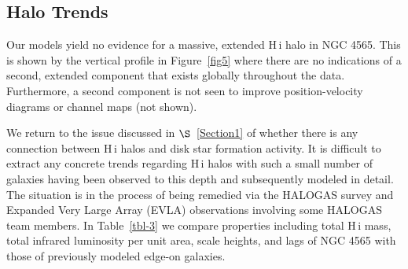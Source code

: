 \documentclass{emulateapj}
\begin{document}
\subsection{Halo Trends} \label{Section6.3}

\par
     Our models yield no evidence for a massive, extended {\sc H\,i} halo in NGC 4565.  This is shown by the vertical profile in Figure~\ref{fig5} where there are no indications of a second, extended component that exists globally throughout the data.  Furthermore, a second component is not seen to improve position-velocity diagrams or channel maps (not shown).  

\par
     We return to the issue discussed in $\S$~\ref{Section1} of whether there is any connection between {\sc H\,i} halos and disk star formation activity.  It is difficult to extract any concrete trends regarding {\sc H\,i} halos with such a small number of galaxies having been observed to this depth and subsequently modeled in detail.  The situation is in the process of being remedied via the HALOGAS survey and Expanded Very Large Array (EVLA) observations involving some HALOGAS team members.  In Table~\ref{tbl-3} we compare properties including total {\sc H\,i} mass, total infrared luminosity per unit area, scale heights, and lags of NGC 4565 with those of previously modeled edge-on galaxies. 
\end{document}

